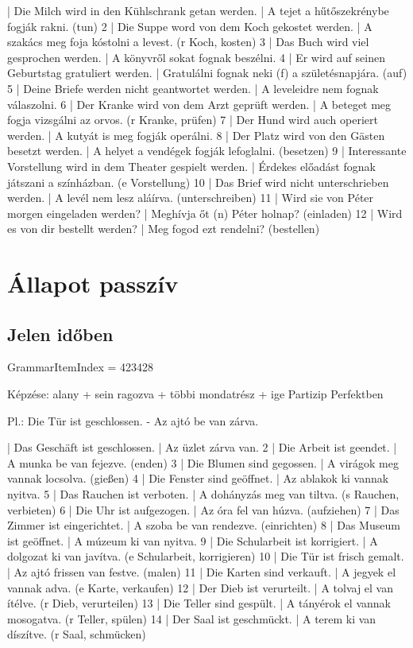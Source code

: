\documentclass{article}
\newenvironment{desc}{\verbatim}{\endverbatim}
\newenvironment{exmp}{\verbatim}{\endverbatim}
\begin{document}
\begin{exmp}
1 | Die Milch wird in den Kühlschrank getan werden. | A tejet a hűtőszekrénybe fogják rakni. (tun)
2 | Die Suppe word von dem Koch gekostet werden. | A szakács meg foja kóstolni a levest. (r Koch, kosten)
3 | Das Buch wird viel gesprochen werden. | A könyvről sokat fognak beszélni.
4 | Er wird auf seinen Geburtstag gratuliert werden. | Gratulálni fognak neki (f) a születésnapjára. (auf)
5 | Deine Briefe werden nicht geantwortet werden. | A leveleidre nem fognak válaszolni.
6 | Der Kranke wird von dem Arzt geprüft werden. | A beteget meg fogja vizsgálni az orvos. (r Kranke, prüfen)
7 | Der Hund wird auch operiert werden. | A kutyát is meg fogják operálni.
8 | Der Platz wird von den Gästen besetzt werden. | A helyet a vendégek fogják lefoglalni. (besetzen)
9 | Interessante Vorstellung wird in dem Theater gespielt werden. | Érdekes előadást fognak játszani a színházban. (e Vorstellung)
10 | Das Brief wird nicht unterschrieben werden. | A levél nem lesz aláírva. (unterschreiben)
11 | Wird sie von Péter morgen eingeladen werden? | Meghívja őt (n) Péter holnap? (einladen)
12 | Wird es von dir bestellt werden? | Meg fogod ezt rendelni? (bestellen)
\end{exmp}

\section{Állapot passzív}

\subsection{Jelen időben}

GrammarItemIndex = 423428

\begin{desc}
Képzése:
alany + sein ragozva + többi mondatrész + ige Partizip Perfektben

Pl.: Die Tür ist geschlossen. - Az ajtó be van zárva.
\end{desc}

\begin{exmp}
1 | Das Geschäft ist geschlossen. | Az üzlet zárva van.
2 | Die Arbeit ist geendet. | A munka be van fejezve. (enden)
3 | Die Blumen sind gegossen. | A virágok meg vannak locsolva. (gießen)
4 | Die Fenster sind geöffnet. | Az ablakok ki vannak nyitva.
5 | Das Rauchen ist verboten. | A dohányzás meg van tiltva. (s Rauchen, verbieten)
6 | Die Uhr ist aufgezogen. | Az óra fel van húzva. (aufziehen)
7 | Das Zimmer ist eingerichtet. | A szoba be van rendezve. (einrichten) 
8 | Das Museum ist geöffnet. | A múzeum ki van nyitva.
9 | Die Schularbeit ist korrigiert. | A dolgozat ki van javítva. (e Schularbeit, korrigieren)
10 | Die Tür ist frisch gemalt. | Az ajtó frissen van festve. (malen)
11 | Die Karten sind verkauft. | A jegyek el vannak adva. (e Karte, verkaufen)
12 | Der Dieb ist verurteilt. | A tolvaj el van ítélve. (r Dieb, verurteilen)
13 | Die Teller sind gespült. | A tányérok el vannak mosogatva. (r Teller, spülen)
14 | Der Saal ist geschmückt. | A terem ki van díszítve. (r Saal, schmücken)
\end{exmp}
\end{document}
